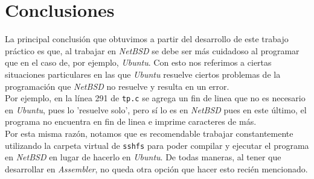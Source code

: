 \documentclass[a4paper, 10pt]{article}
\def\code#1{\texttt{#1}}
\newcommand\tab[1][0.5cm]{\hspace*{#1}}
\begin{document}
	\section{Conclusiones}
		La principal conclusión que obtuvimos a partir del desarrollo de este trabajo práctico es que, al trabajar en \emph{NetBSD}
		se debe ser más cuidadoso al programar que en el caso de, por ejemplo, \emph{Ubuntu}. Con esto nos referimos a ciertas
		situaciones particulares en las que \emph{Ubuntu} resuelve ciertos problemas de la programación que \emph{NetBSD} no resuelve
		y resulta en un error. \\
		\tab Por ejemplo, en la línea 291 de \code{tp.c} se agrega un fin de linea que no es necesario en \emph{Ubuntu}, pues lo
		'resuelve solo', pero sí lo es en \emph{NetBSD} pues en este último, el programa no encuentra en fin de linea e imprime
		caracteres de más. \\
		\tab Por esta misma razón, notamos que es recomendable trabajar constantemente utilizando la carpeta virtual de \code{sshfs}
		para poder compilar y ejecutar el programa en \emph{NetBSD} en lugar de hacerlo en \emph{Ubuntu}. De todas maneras, al tener
		que desarrollar en \emph{Assembler}, no queda otra opción que hacer esto recién mencionado.
\end{document}
